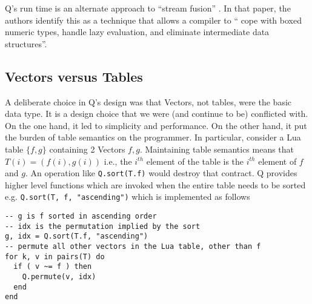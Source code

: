 Q's run time is an alternate approach to ``stream fusion''
\cite{Mainland2017}. In
that paper, the authors identify this as a technique that allows a compiler to
`` cope with boxed numeric types, handle lazy evaluation, and
eliminate intermediate data structures''.
\subsection{Vectors versus Tables}
\label{vectors_versus_tables}

A deliberate choice in Q's design was that Vectors, not tables, were the basic
data type. It is a design choice that we were (and continue to be) conflicted with. On the one hand,
it led to simplicity and performance. On the other hand, it put the burden of
table semantics on the programmer. In particular, consider a 
Lua table \(\{f, g\}\) containing 2 Vectors \(f, g\). Maintaining table
semantics means that \(T(i) = (f(i), g(i))\)  i.e., the \(i^{th}\) element of
the table is the \(i^{th}\) element of \(f\) and \(g\). An 
operation like {\tt Q.sort(T.f)} would destroy that contract. Q
provides higher level functions which are invoked when the entire table needs to
be sorted e.g. {\tt Q.sort(T, f, "ascending")} which is implemented as follows
\begin{verbatim}
-- g is f sorted in ascending order
-- idx is the permutation implied by the sort
g, idx = Q.sort(T.f, "ascending")
-- permute all other vectors in the Lua table, other than f
for k, v in pairs(T) do 
  if ( v ~= f ) then 
    Q.permute(v, idx)
  end
end
\end{verbatim}
